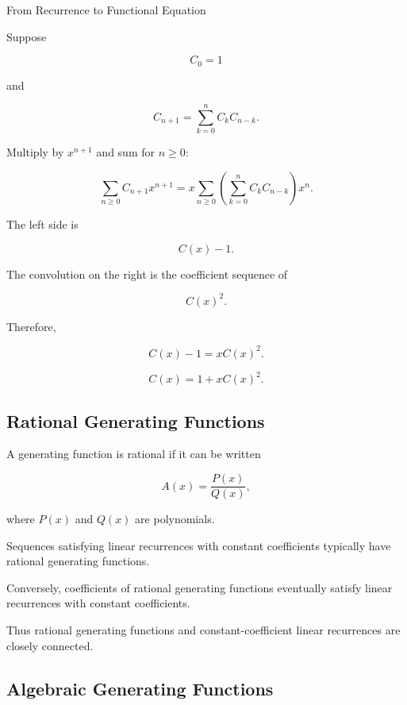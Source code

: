 \begin{workedexamplebox}{From Recurrence to Functional Equation}

Suppose

\[
C_0=1
\]

and

\[
C_{n+1}
=
\sum_{k=0}^{n}C_kC_{n-k}.
\]

Multiply by \(x^{n+1}\) and sum for \(n\geq0\):

\[
\sum_{n\geq0}C_{n+1}x^{n+1}
=
x
\sum_{n\geq0}
\left(
\sum_{k=0}^{n}C_kC_{n-k}
\right)x^n.
\]

The left side is

\[
C(x)-1.
\]

The convolution on the right is the coefficient sequence of

\[
C(x)^2.
\]

Therefore,

\[
C(x)-1=xC(x)^2.
\]

\begin{answerbox}
\[
\boxed{
C(x)=1+xC(x)^2.
}
\]
\end{answerbox}

\end{workedexamplebox}

\subsection{Rational Generating Functions}
\label{subsec:rational-generating-functions}

A generating function is rational if it can be written

\[
\boxed{
A(x)=\frac{P(x)}{Q(x)},
}
\]

where \(P(x)\) and \(Q(x)\) are polynomials.

Sequences satisfying linear recurrences with constant coefficients
typically have rational generating functions.

Conversely, coefficients of rational generating functions eventually
satisfy linear recurrences with constant coefficients.

Thus rational generating functions and constant-coefficient linear
recurrences are closely connected.

\subsection{Algebraic Generating Functions}
\label{subsec:algebraic-generating-functions}

